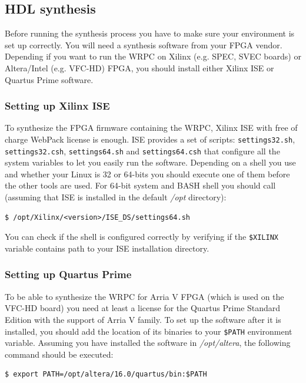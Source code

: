 \documentclass[a4paper, 12pt]{article}
\begin{document}
\subsection{HDL synthesis}
\label{HDL synthesis}

Before running the synthesis process you have to make sure your environment is
set up correctly. You will need a synthesis software from your FPGA vendor.
Depending if you want to run the WRPC on Xilinx (e.g. SPEC, SVEC boards) or
Altera/Intel (e.g. VFC-HD) FPGA, you should install either Xilinx ISE or Quartus
Prime software.

\subsubsection{Setting up Xilinx ISE}
To synthesize the FPGA firmware containing the WRPC, Xilinx ISE with free of
charge WebPack license is enough. ISE provides a set of scripts:
\texttt{settings32.sh}, \texttt{settings32.csh}, \texttt{settings64.sh} and
\texttt{settings64.csh} that configure all the system variables to let you
easily run the software. Depending on a shell you use and whether your Linux is
32 or 64-bits you should execute one of them before the other tools are used.
For 64-bit system and BASH shell you should call (assuming that ISE is installed
in the default \textit{/opt} directory):
\begin{lstlisting}
$ /opt/Xilinx/<version>/ISE_DS/settings64.sh
\end{lstlisting}

You can check if the shell is configured correctly by verifying if the
\texttt{\$XILINX} variable contains path to your ISE installation directory.

\subsubsection{Setting up Quartus Prime}
To be able to synthesize the WRPC for Arria V FPGA (which is used on the VFC-HD
board) you need at least a license for the Quartus Prime Standard Edition with
the support of Arria V family. To set up the software after it is installed, you
should add the location of its binaries to your \texttt{\$PATH} environment
variable. Assuming you have installed the software in \textit{/opt/altera}, the
following command should be executed:
\begin{lstlisting}
$ export PATH=/opt/altera/16.0/quartus/bin:$PATH
\end{lstlisting}
\end{document}
